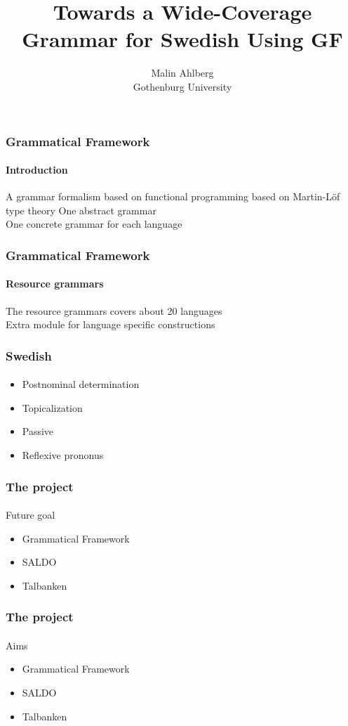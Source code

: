 \documentclass[10pt]{beamer}
\title{Towards a Wide-Coverage Grammar for Swedish Using GF}
\author{Malin Ahlberg \\ Gothenburg University}
\date{}
\begin{document}
\maketitle

 \begin{frame}
  \frametitle{Grammatical Framework}
  \framesubtitle{Introduction}
  A grammar formalism based on functional programming 
  based on Martin-Löf type theory
  \vspace{5mm}
  \pause
  One abstract grammar \\
  \pause
  One concrete grammar for each language \\
 \end{frame}

 \begin{frame}
  \frametitle{Grammatical Framework}
  \framesubtitle{Resource grammars}
  The resource grammars covers about 20 languages \\
  \vspace{5mm}
  \pause
  Extra module for language specific constructions
 \end{frame}

\begin{frame}
\frametitle{Swedish}
\framesubtitle{} 
\begin{itemize}
\item{Postnominal determination}
\item{Topicalization}
\item{Passive}
\item{Reflexive prononus}
\end{itemize}
\end{frame}

\begin{frame}
\frametitle{The project}
\framesubtitle{} 
Future goal
\begin{itemize}
\item{Grammatical Framework}
\item{SALDO}
\item{Talbanken}
\end{itemize}
\end{frame}



\begin{frame}
\frametitle{The project}
\framesubtitle{} 
Aims 
\begin{itemize}
\item{Grammatical Framework}
\item{SALDO}
\item{Talbanken}
\end{itemize}
\end{frame}
\end{document}
